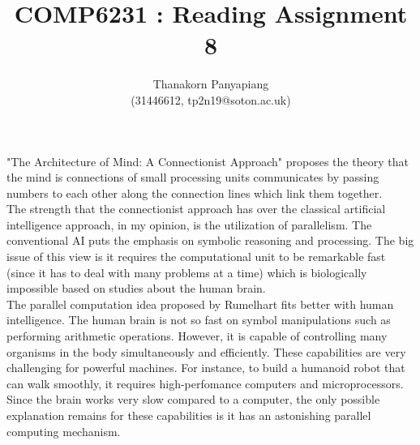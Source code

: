 \documentclass{article}
\title{COMP6231 : Reading Assignment 8}
\author{Thanakorn Panyapiang\\
(31446612, tp2n19@soton.ac.uk)}
\date{}
\begin{document}
\maketitle

"The Architecture of Mind: A Connectionist Approach" proposes the theory that the mind is connections of small processing units communicates by passing numbers to each other along the connection lines which link them together.\\
\indent The strength that the connectionist approach has over the classical artificial intelligence approach, in my opinion, is the utilization of parallelism. The conventional AI puts the emphasis on symbolic reasoning and processing. The big issue of this view is it requires the computational unit to be remarkable fast (since it has to deal with many problems at a time) which is biologically impossible based on studies about the human brain. \\
\indent The parallel computation idea proposed by Rumelhart fits better with human intelligence. The human brain is not so fast on symbol manipulations such as performing arithmetic operations. However, it is capable of controlling many organisms in the body simultaneously and efficiently. These capabilities are very challenging for powerful machines. For instance, to build a humanoid robot that can walk smoothly, it requires high-perfomance computers and microprocessors. Since the brain works very slow compared to a computer, the only possible explanation remains for these capabilities is it has an astonishing parallel computing mechanism.
\end{document}
